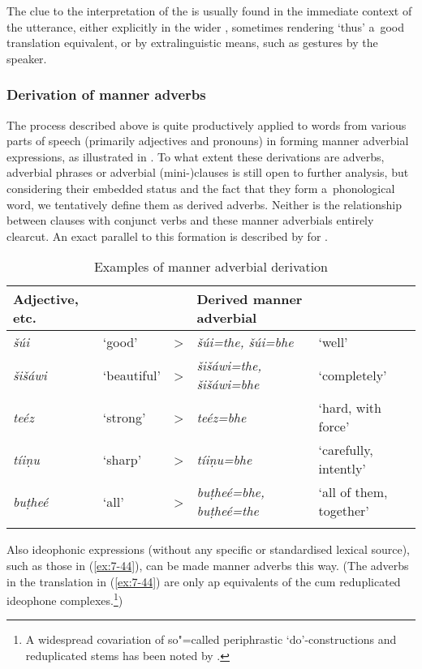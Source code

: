 The clue to the interpretation of the   is usually found in the immediate context of the utterance, either explicitly in the wider , sometimes rendering `thus' a~good translation equivalent, or by extralinguistic means, such as gestures by the speaker. 


\subsubsection*{Derivation of manner adverbs}

The  process described above is quite productively applied to words from various parts
of speech (primarily adjectives and pronouns) in forming manner adverbial expressions, as
illustrated in . To what extent these derivations are adverbs, adverbial phrases or
adverbial (mini-)clauses is still open to further analysis, but considering their embedded status
and the fact that they form a~phonological word, we tentatively define them as derived
adverbs. Neither is the relationship between  clauses with conjunct verbs and these manner
adverbials entirely clearcut. An exact parallel to this formation is described by
\citet[219]{schmidtkohistani2008} for  .


\begin{table}[ht]
\caption{Examples of manner adverbial derivation}

\begin{tabularx}{\textwidth}{ P{17mm} l l Q Q }
\lsptoprule
Adjective, etc. &
&
&
Derived manner adverbial &
\\\hline
\textit{šúi} &
`good' &
{\textgreater} &
\textit{šúi=the, šúi=bhe} &
`well'\\
\textit{šišáwi} &
`beautiful' &
{\textgreater} &
\textit{šišáwi=the, šišáwi=bhe} &
`completely'\\
\textit{teéz} &
`strong' &
{\textgreater} &
\textit{teéz=bhe} &
`hard, with force'\\
\textit{tíiṇu} &
`sharp' &
{\textgreater} &
\textit{tíiṇu=bhe} &
`carefully, intently'\\
\textit{buṭheé} &
`all' &
{\textgreater} &
\textit{buṭheé=bhe, buṭheé=the} &
`all of them, together'\\\lspbottomrule
\end{tabularx}
\label{tab:7-3}
\end{table}


Also ideophonic expressions (without any specific or standardised lexical source), such as those in (\ref{ex:7-44}), can be made manner adverbs this way. (The adverbs in the  translation in (\ref{ex:7-44}) are only ap equivalents of the  cum reduplicated ideophone complexes.\footnote{A widespread covariation of so"=called periphrastic `do'-constructions and reduplicated stems has been noted by \citet{jaeger2006}.})

